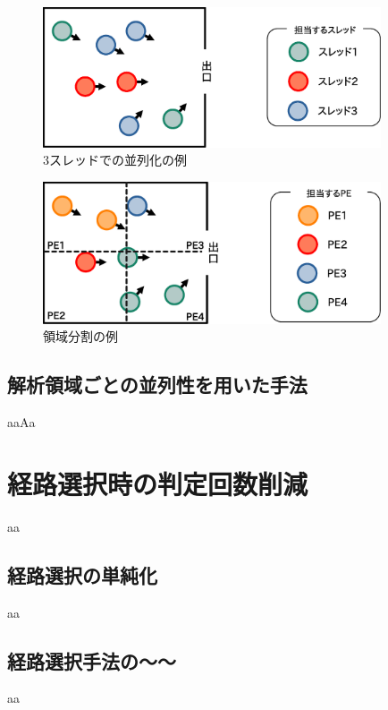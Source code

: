 \begin{figure}[hp]
 \begin{center}
  \includegraphics[width=10cm,clip]{figure/sureddo_heiretu.eps}
  \caption{3スレッドでの並列化の例}
  \label{fig:atigenshou}
 \end{center}
\end{figure}


\begin{figure}[hbtp]
 \begin{center}
  \includegraphics[width=10cm,clip]{figure/ryoiki_heiretu.eps}
  \caption{領域分割の例}
  \label{fig:atigenshou}
 \end{center}
\end{figure}


\clearpage

\subsection{解析領域ごとの並列性を用いた手法}
aaAa

\section{経路選択時の判定回数削減}
aa

\subsection{経路選択の単純化}
aa

\subsection{経路選択手法の～～}
aa

